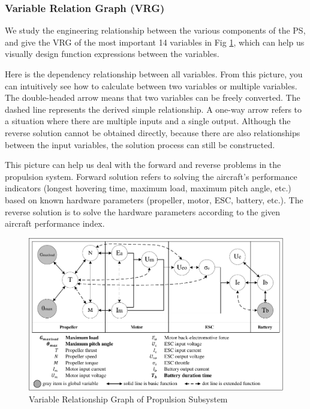 \documentclass{article} %
\numberwithin{equation}{section} %
\begin{document}
\subsubsection{Variable Relation Graph (VRG) }

We study the engineering relationship between the various components of the PS, and give the VRG of the most important 14 variables in Fig \ref{fig:fig1_VariableFlow}, which can help us visually design function expressions between the variables.

Here is the dependency relationship between all variables. 
From this picture, you can intuitively see how to calculate between two variables or multiple variables.
The double-headed arrow means that two variables can be freely converted.
The dashed line represents the derived simple relationship.
A one-way arrow refers to a situation where there are multiple inputs and a single output. 
Although the reverse solution cannot be obtained directly, because there are also relationships between the input variables, the solution process can still be constructed.

This picture can help us deal with the forward and reverse problems in the propulsion system.
Forward solution refers to solving the aircraft's performance indicators (longest hovering time, maximum load, maximum pitch angle, etc.) based on known hardware parameters (propeller, motor, ESC, battery, etc.).
The reverse solution is to solve the hardware parameters according to the given aircraft performance index.

\begin{figure}[H]%
\centerline{\includegraphics[width=1.0\textwidth]{fig1_VariableFlow.pdf}}
\caption{Variable Relationship Graph of Propulsion Subsystem}
\label{fig:fig1_VariableFlow}
\end{figure}
\end{document}
